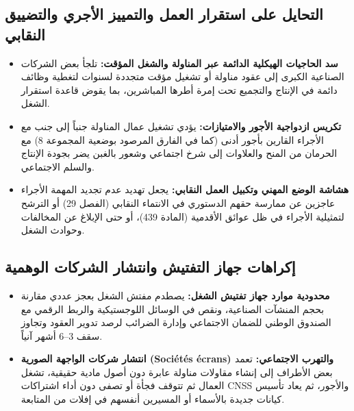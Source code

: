 \subsection{التحايل على استقرار العمل والتمييز الأجري والتضييق النقابي}
\begin{itemize}[leftmargin=*, itemsep=6pt]
    \item \textbf{سد الحاجيات الهيكلية الدائمة عبر المناولة والشغل المؤقت:} تلجأ بعض الشركات الصناعية الكبرى إلى عقود مناولة أو تشغيل مؤقت متجددة لسنوات لتغطية وظائف دائمة في الإنتاج والتجميع تحت إمرة أطرها المباشرين، بما يقوض قاعدة استقرار الشغل.
    \item \textbf{تكريس ازدواجية الأجور والامتيازات:} يؤدي تشغيل عمال المناولة جنباً إلى جنب مع الأجراء القارين بأجور أدنى (كما في الفارق المرصود بوضعية المجموعة \textenglish{8}) مع الحرمان من المنح والعلاوات إلى شرخ اجتماعي وشعور بالغبن يضر بجودة الإنتاج والسلم الاجتماعي.
    \item \textbf{هشاشة الوضع المهني وتكبيل العمل النقابي:} يجعل تهديد عدم تجديد المهمة الأجراء عاجزين عن ممارسة حقهم الدستوري في الانتماء النقابي (الفصل \textenglish{29}) أو الترشح لتمثيلية الأجراء في ظل عوائق الأقدمية (المادة \textenglish{439})، أو حتى الإبلاغ عن المخالفات وحوادث الشغل.
\end{itemize}

\subsection{إكراهات جهاز التفتيش وانتشار الشركات الوهمية}
\begin{itemize}[leftmargin=*, itemsep=6pt]
    \item \textbf{محدودية موارد جهاز تفتيش الشغل:} يصطدم مفتش الشغل بعجز عددي مقارنة بحجم المنشآت الصناعية، ونقص في الوسائل اللوجستيكية والربط الرقمي مع الصندوق الوطني للضمان الاجتماعي وإدارة الضرائب لرصد تدوير العقود وتجاوز سقف \textenglish{3}--\textenglish{6} أشهر آنياً.
    \item \textbf{انتشار شركات الواجهة الصورية (\texorpdfstring{\textenglish{Sociétés écrans}}{Sociétés écrans}) والتهرب الاجتماعي:} تعمد بعض الأطراف إلى إنشاء مقاولات مناولة عابرة دون أصول مادية حقيقية، تشغل العمال ثم تتوقف فجأة أو تصفى دون أداء اشتراكات \textenglish{CNSS} والأجور، ثم يعاد تأسيس كيانات جديدة بالأسماء أو المسيرين أنفسهم في إفلات من المتابعة.
\end{itemize}

